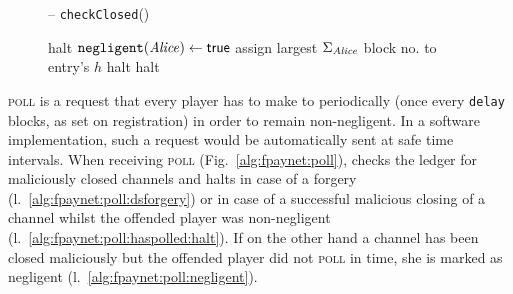 \begin{figure}[H]
\begin{systembox}{\fpaynet{} -- \texttt{checkClosed}()}
\begin{algorithmic}[1]
              \label{alg:fpaynet:close:func:ifmalicious}
                \State halt
                \label{alg:fpaynet:close:func:malicious}
              \Else
                \State $\mathtt{negligent}(\mathit{Alice}) \gets \mathsf{true}$
              \EndIf
              \State assign largest $\Sigma_{\mathit{Alice}}$ block no. to entry's $h$
            \label{alg:fpaynet:close:func:ifidle}
              \State halt
              \label{alg:fpaynet:close:func:idle}
            \EndIf
          \EndFor
            \State halt
            \label{alg:fpaynet:close:func:balance}
          \EndIf
        \EndFunction
        \label{alg:fpaynet:close:func:end}
      \end{algorithmic}
    \end{systembox}
    \caption{}
    \label{alg:fpaynet:close:func}
  \end{figure}

  \textsc{poll} is a request that every player has to make to \fpaynet{}
  periodically (once every \texttt{delay} blocks, as set on registration) in
  order to remain non-negligent. In a software implementation, such a request
  would be automatically sent at safe time intervals. When receiving
  \textsc{poll} (Fig.~\ref{alg:fpaynet:poll}), \fpaynet{} checks the ledger for
  maliciously closed channels and halts in case of a forgery
  (l.~\ref{alg:fpaynet:poll:dsforgery}) or in case of a successful malicious
  closing of a channel whilst the offended player was non-negligent
  (l.~\ref{alg:fpaynet:poll:haspolled:halt}). If on the other hand a channel has
  been closed maliciously but the offended player did not \textsc{poll} in time,
  she is marked as negligent (l.~\ref{alg:fpaynet:poll:negligent}).

